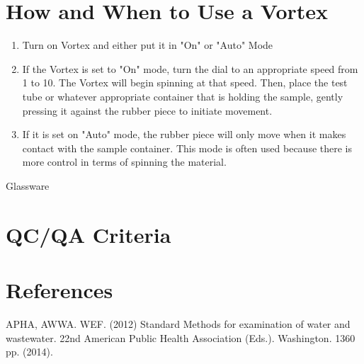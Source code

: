 \documentclass[12pt]{../SOP3_beta}\usepackage[]{graphicx}\usepackage[]{color}
\begin{document}
\section{How and When to Use a Vortex}
\begin{enumerate}
  \item Turn on Vortex and either put it in "On" or "Auto" Mode
  \item If the Vortex is set to "On" mode, turn the dial to an appropriate speed from 1 to 10. The Vortex will begin spinning at that speed. Then, place the test tube or whatever appropriate container that is holding the sample, gently pressing it against the rubber piece to initiate movement.
  \item  If it is set on "Auto" mode, the rubber piece will only move when it makes contact with the sample container. This mode is often used because there is more control in terms of spinning the material. 
\end{enumerate}

\NP Glassware




\section{QC/QA Criteria}

\section{References}

\NP APHA, AWWA. WEF. (2012) Standard Methods for examination of water and wastewater. 22nd American Public Health Association (Eds.). Washington. 1360 pp. (2014).
\end{document}
